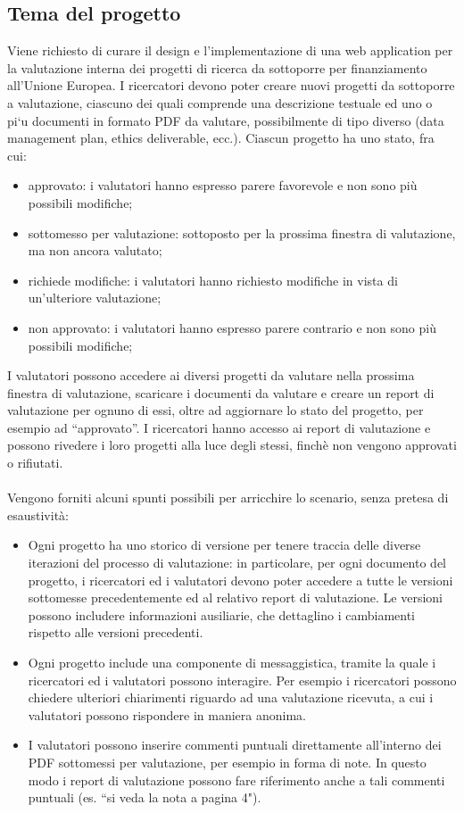 \documentclass{article}
\begin{document}
\subsection{Tema del progetto}
\par
Viene richiesto di curare il design e l'implementazione di una web application per la valutazione interna dei
progetti di ricerca da sottoporre per finanziamento all'Unione Europea. I ricercatori devono poter creare
nuovi progetti da sottoporre a valutazione, ciascuno dei quali comprende una descrizione testuale ed uno o
pi`u documenti in formato PDF da valutare, possibilmente di tipo diverso (data management plan, ethics
deliverable, ecc.). Ciascun progetto ha uno stato, fra cui:
\begin{itemize}
    \item approvato: i valutatori hanno espresso parere favorevole e non sono più possibili modifiche;
    \item sottomesso per valutazione: sottoposto per la prossima finestra di valutazione, ma non ancora valutato;
    \item richiede modifiche: i valutatori hanno richiesto modifiche in vista di un'ulteriore valutazione;
    \item non approvato: i valutatori hanno espresso parere contrario e non sono più possibili modifiche;
\end{itemize}
I valutatori possono accedere ai diversi progetti da valutare nella prossima finestra di valutazione, scaricare
i documenti da valutare e creare un report di valutazione per ognuno di essi, oltre ad aggiornare lo stato del
progetto, per esempio ad “approvato”. I ricercatori hanno accesso ai report di valutazione e possono rivedere
i loro progetti alla luce degli stessi, finchè non vengono approvati o rifiutati.\\\\Vengono forniti alcuni spunti possibili per arricchire lo scenario, senza pretesa di esaustività:
\begin{itemize}
    \item Ogni progetto ha uno storico di versione per tenere traccia delle diverse iterazioni del processo di
    valutazione: in particolare, per ogni documento del progetto, i ricercatori ed i valutatori devono poter
    accedere a tutte le versioni sottomesse precedentemente ed al relativo report di valutazione. Le versioni
    possono includere informazioni ausiliarie, che dettaglino i cambiamenti rispetto alle versioni precedenti.
    \item Ogni progetto include una componente di messaggistica, tramite la quale i ricercatori ed i valutatori
    possono interagire. Per esempio i ricercatori possono chiedere ulteriori chiarimenti riguardo ad una
    valutazione ricevuta, a cui i valutatori possono rispondere in maniera anonima.
    \item I valutatori possono inserire commenti puntuali direttamente all'interno dei PDF sottomessi per valutazione, per esempio in forma di note. In questo modo i report di valutazione possono fare riferimento
    anche a tali commenti puntuali (es. “si veda la nota a pagina 4").
    
\end{itemize}
\end{document}
